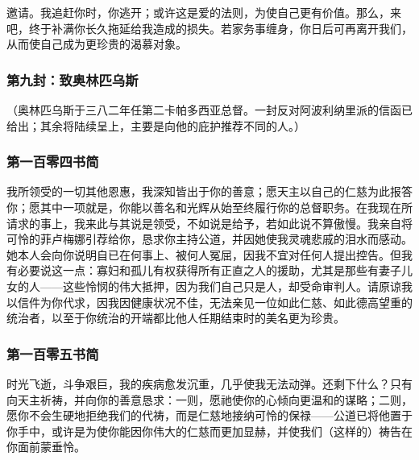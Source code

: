 邀请。我追赶你时，你逃开；或许这是爱的法则，为使自己更有价值。那么，来吧，终于补满你长久拖延给我造成的损失。若家务事缠身，你日后可再离开我们，从而使自己成为更珍贵的渴慕对象。\par


\subsubsection{第九封：致奥林匹乌斯}

（奥林匹乌斯于三八二年任第二卡帕多西亚总督。一封反对阿波利纳里派的信函已给出；其余将陆续呈上，主要是向他的庇护推荐不同的人。）\par


\subsubsection{第一百零四书简}

我所领受的一切其他恩惠，我深知皆出于你的善意；愿天主以自己的仁慈为此报答你；愿其中一项就是，你能以善名和光辉从始至终履行你的总督职务。在我现在所请求的事上，我来此与其说是领受，不如说是给予，若如此说不算傲慢。我亲自将可怜的菲卢梅娜引荐给你，恳求你主持公道，并因她使我灵魂悲戚的泪水而感动。她本人会向你说明自已在何事上、被何人冤屈，因我不宜对任何人提出控告。但我有必要说这一点：寡妇和孤儿有权获得所有正直之人的援助，尤其是那些有妻子儿女的人——这些怜悯的伟大抵押，因为我们自己只是人，却受命审判人。请原谅我以信件为你代求，因我因健康状况不佳，无法亲见一位如此仁慈、如此德高望重的统治者，以至于你统治的开端都比他人任期结束时的美名更为珍贵。\par


\subsubsection{第一百零五书简}

时光飞逝，斗争艰巨，我的疾病愈发沉重，几乎使我无法动弹。还剩下什么？只有向天主祈祷，并向你的善意恳求：一则，愿祂使你的心倾向更温和的谋略；二则，愿你不会生硬地拒绝我们的代祷，而是仁慈地接纳可怜的保禄——公道已将他置于你手中，或许是为使你能因你伟大的仁慈而更加显赫，并使我们（这样的）祷告在你面前蒙垂怜。\par

